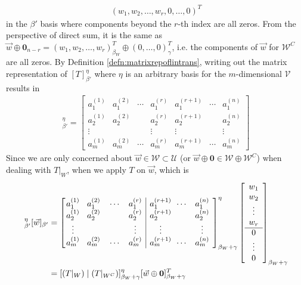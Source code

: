 \begin{align*}
(w_1, w_2, \ldots, w_r, 0, \ldots, 0)^T
\end{align*}
in the $\mathcal{\beta}'$ basis where components beyond the $r$-th index are all zeros. From the perspective of direct sum, it is the same as $\vec{w} \oplus \textbf{0}_{n-r} = (w_1, w_2, \ldots, w_r)_{\beta_W}^T \oplus (0, \ldots, 0)_{\gamma}^T$, i.e. the components of $\vec{w}$ for $\mathcal{W}^C$ are all zeros. By Definition \ref{defn:matrixrepoflintrans}, writing out the matrix representation of $[T]_{\beta'}^\eta$ where $\eta$ is an arbitrary basis for the $m$-dimensional $\mathcal{V}$ results in
\begin{align*}
[T]_{\beta'}^\eta = \begin{bmatrix}
a_1^{(1)} & a_1^{(2)} & \cdots & a_1^{(r)} & a_1^{(r+1)} & \cdots & a_1^{(n)} \\
a_2^{(1)} & a_2^{(2)} & & a_2^{(r)} & a_2^{(r+1)} & & a_2^{(n)} \\
\vdots & & & \vdots & \vdots & & \vdots \\
a_m^{(1)} & a_m^{(2)} & \cdots & a_m^{(r)} & a_m^{(r+1)} & \cdots & a_m^{(n)}
\end{bmatrix}
\end{align*}
Since we are only concerned about $\vec{w} \in \mathcal{W} \subset \mathcal{U}$ (or $\vec{w} \oplus \textbf{0} \in \mathcal{W} \oplus \mathcal{W}^C$) when dealing with $T|_W$, when we apply $T$ on $\vec{w}$, which is
\begin{align}
[T]_{\beta'}^\eta[\vec{w}]_{\beta'}
&=
\left[\begin{array}{@{\,}wc{15pt}wc{15pt}wc{15pt}wc{15pt}|@{\quad}wc{15pt}wc{15pt}wc{15pt}}
a_1^{(1)} & a_1^{(2)} & \cdots & a_1^{(r)} & a_1^{(r+1)} & \cdots & a_1^{(n)} \\
a_2^{(1)} & a_2^{(2)} & & a_2^{(r)} & a_2^{(r+1)} & & a_2^{(n)} \\
\vdots & & & \vdots & \vdots & & \vdots \\
a_m^{(1)} & a_m^{(2)} & \cdots & a_m^{(r)} & a_m^{(r+1)} & \cdots & a_m^{(n)}
\end{array}\right]_{\beta_W+\gamma}^\eta
\left[\begin{array}{c}
w_1 \\
w_2 \\
\vdots \\
w_r \\
\hline
0 \\
\vdots \\
0
\end{array}\right]_{\beta_W+\gamma} \nonumber \\
&= [(T|_W)\mid(T|_{W^C})]_{\beta_W+\gamma}^\eta [\vec{w} \oplus \textbf{0}]^T_{\beta_W+\gamma} 
\end{align}
